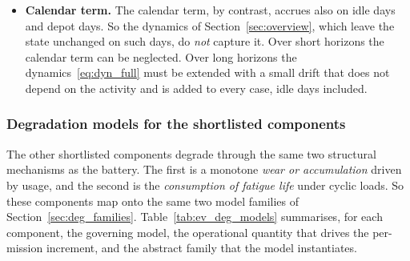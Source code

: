 \documentclass[11pt,a4paper]{article}
\theoremstyle{plain}
\theoremstyle{definition}
\theoremstyle{remark}
\begin{document}
\begin{examplebox}
\begin{itemize}
\begin{itemize}
      \item So the cycling fade is a monotone, mission-dependent accumulation process; the Gamma and inverse Gaussian processes of Section~\ref{sec:stoch_orders} are two models of this kind.
      \item The time-varying increment parameters that the formulation already allows ($\Delta D^{(j)}_{i\ell k}$ may depend on~$k$) absorb the non-stationary (power-law) dependence on time within the horizon.
        Beyond the horizon the endless schedule repeats the increment laws of the operating phase with period~$H_2$ (Section~\ref{sec:damage_dynamics}), so a dependence on time that does not repeat is not represented there.
    \end{itemize}
  \item \textbf{Calendar term.}
    The calendar term, by contrast, accrues also on idle days and depot days.
    So the dynamics of Section~\ref{sec:overview}, which leave the state unchanged on such days, do \emph{not} capture it.
    Over short horizons the calendar term can be neglected.
    Over long horizons the dynamics~\eqref{eq:dyn_full} must be extended with a small drift that does not depend on the activity and is added to every case, idle days included.
\end{itemize}
\end{examplebox}

\subsubsection{Degradation models for the shortlisted components}
\label{sec:ev_deg_models}

The other shortlisted components degrade through the same two structural mechanisms as the battery.
The first is a monotone \emph{wear or accumulation} driven by usage, and the second is the \emph{consumption of fatigue life} under cyclic loads.
So these components map onto the same two model families of Section~\ref{sec:deg_families}.
Table~\ref{tab:ev_deg_models} summarises, for each component, the governing model, the operational quantity that drives the per-mission increment, and the abstract family that the model instantiates.
\end{document}

